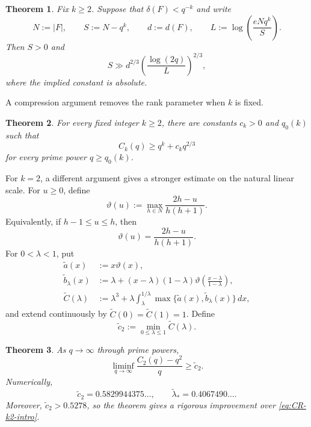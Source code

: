 \documentclass[11pt,reqno]{amsart}
\numberwithin{equation}{section}
\newtheorem{theorem}{Theorem}[section]
\theoremstyle{definition}
\theoremstyle{remark}
\newcommand{\cF}{\mathcal F}
\newcommand{\cC}{\mathcal C}
\newcommand{\abs}[1]{\lvert#1\rvert}
\newcommand{\set}[1]{\{#1\}}
\def\mathbb#1{#1}%
\def\mathcal#1{#1}%
\begin{document}
\begin{theorem}\label{thm:rank-intro}
Fix $k\ge2$.  Suppose that $\delta(\cF)<q^{-k}$ and write
\[
 N:=\abs{\cF},
 \qquad
 S:=N-q^k,
 \qquad
 d:=d(\cF),
 \qquad
 L:=\log\left(\frac{eNq^k}{S}\right).
\]
Then $S>0$ and
\begin{equation}\label{eq:rank-intro}
 S\gg
 d^{2/3}
 \left(\frac{\log(2q)}{L}\right)^{2/3},
\end{equation}
where the implied constant is absolute.
\end{theorem}

A compression argument removes the rank parameter when $k$ is fixed.

\begin{theorem}\label{thm:fixed-k-intro}
For every fixed integer $k\ge2$, there are constants $c_k>0$ and $q_0(k)$ such that
\begin{equation}\label{eq:fixed-k-intro}
 C_k(q)\ge q^k+c_kq^{2/3}
\end{equation}
for every prime power $q\ge q_0(k)$.
\end{theorem}

For $k=2$, a different argument gives a stronger estimate on the natural linear scale.  For $u\ge0$, define
\begin{equation}\label{eq:vartheta-def}
 \vartheta(u):=
 \max_{h\in\mathbb N}
 \frac{2h-u}{h(h+1)}.
\end{equation}
Equivalently, if $h-1\le u\le h$, then
\begin{equation}\label{eq:vartheta-piecewise}
 \vartheta(u)=\frac{2h-u}{h(h+1)}.
\end{equation}
For $0<\lambda<1$, put
\begin{align}
 \widetilde a(x)
 &:=x\vartheta(x),\label{eq:atilde-def}\\
 \widetilde b_\lambda(x)
 &:=\lambda+(x-\lambda)(1-\lambda)
 \vartheta\left(\frac{x-\lambda}{1-\lambda}\right),
 \label{eq:btilde-def}\\
 \widetilde{\cC}(\lambda)
 &:=\lambda^3+
 \lambda\int_\lambda^{1/\lambda}
 \max\set{\widetilde a(x),\widetilde b_\lambda(x)}\,dx,
 \label{eq:Ctilde-lambda}
\end{align}
and extend continuously by
$\widetilde{\cC}(0)=\widetilde{\cC}(1)=1$.  Define
\begin{equation}\label{eq:c2tilde}
 \widetilde c_2
 :=\min_{0\le\lambda\le1}\widetilde{\cC}(\lambda).
\end{equation}

\begin{theorem}\label{thm:c2-intro}
As $q\to\infty$ through prime powers,
\begin{equation}\label{eq:c2-intro}
 \liminf_{q\to\infty}
 \frac{C_2(q)-q^2}{q}
 \ge\widetilde c_2.
\end{equation}
Numerically,
\[
 \widetilde c_2=0.5829944375\ldots,
 \qquad
 \widetilde\lambda_*=0.4067490\ldots.
\]
Moreover, $\widetilde c_2>0.5278$, so the theorem gives a rigorous improvement over \eqref{eq:CR-k2-intro}.
\end{theorem}
\end{document}
